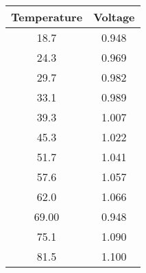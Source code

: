 \begin{center}
\begin{tabular}{|c|c|}
\hline
\textbf{Temperature} & \textbf{Voltage} \\
\hline
\large
18.7 & 0.948 \\
\hline
\large
24.3 & 0.969 \\
\hline
\large
29.7 & 0.982 \\
\hline
\large
33.1 & 0.989 \\
\hline
\large
39.3 & 1.007 \\
\hline
\large
45.3 & 1.022 \\
\hline
\large
51.7 & 1.041 \\
\hline
\large
57.6 & 1.057 \\
\hline
\large
62.0 & 1.066 \\
\hline
\large
69.00 & 0.948 \\
\hline
\large
75.1 & 1.090 \\
\hline
\large
81.5 & 1.100 \\
\hline
\end{tabular}
\end{center}